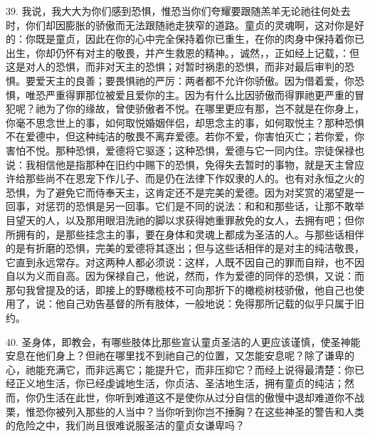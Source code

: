 39. 我说，我大大为你们感到恐惧，惟恐当你们夸耀要跟随羔羊无论祂往何处去时，你们却因膨胀的骄傲而无法跟随祂走狭窄的道路。童贞的灵魂啊，这对你是好的：你既是童贞，因此在你的心中完全保持着你已重生，在你的肉身中保持着你已出生，你却仍怀有对主的敬畏，并产生救恩的精神。，诚然，，正如经上记载，：但这是对人的恐惧，而非对天主的恐惧；对暂时祸患的恐惧，而非对最后审判的恐惧。要爱天主的良善；要畏惧祂的严厉：两者都不允许你骄傲。因为借着爱，你恐惧，唯恐严重得罪那位被爱且爱你的主。因为有什么比因骄傲而得罪祂更严重的冒犯呢？祂为了你的缘故，曾使骄傲者不悦。在哪里更应有那，岂不就是在你身上，你毫不思念世上的事，如何取悦婚姻伴侣，却思念主的事，如何取悦主？那种恐惧不在爱德中，但这种纯洁的敬畏不离弃爱德。若你不爱，你害怕灭亡；若你爱，你害怕不悦。那种恐惧，爱德将它驱逐；这种恐惧，爱德与它一同内住。宗徒保禄也说：我相信他是指那种在旧约中赐下的恐惧，免得失去暂时的事物，就是天主曾应许给那些尚不在恩宠下作儿子、而是仍在法律下作奴隶的人的。也有对永恒之火的恐惧，为了避免它而侍奉天主，这肯定还不是完美的爱德。因为对奖赏的渴望是一回事，对惩罚的恐惧是另一回事。它们是不同的说法：和和和那些话，让那不敢举目望天的人，以及那用眼泪洗祂的脚以求获得她重罪赦免的女人，去拥有吧；但你所拥有的，是那些挂念主的事，要在身体和灵魂上都成为圣洁的人。与那些话相伴的是有折磨的恐惧，完美的爱德将其逐出；但与这些话相伴的是对主的纯洁敬畏，它直到永远常存。对这两种人都必须说：这样，人既不因自己的罪而自辩，也不因自以为义而自高。因为保禄自己，他说，然而，作为爱德的同伴的恐惧，又说：而那句我曾提及的话，即接上的野橄榄枝不可向那折下的橄榄树枝骄傲，他自己也使用了，说：他自己劝告基督的所有肢体，一般地说：免得那所记载的似乎只属于旧约。\par

40. 圣身体，即教会，有哪些肢体比那些宣认童贞圣洁的人更应该谨慎，使圣神能安息在他们身上？但祂在哪里找不到祂自己的位置，又怎能安息呢？除了谦卑的心，祂能充满它，而非远离它；能提升它，而非压抑它？而经上说得最清楚：你已经正义地生活，你已经虔诚地生活，你贞洁、圣洁地生活，拥有童贞的纯洁；然而，你仍生活在此世，你听到难道这不是使你从过分自信的傲慢中退却难道你不战栗，惟恐你被列入那些的人当中？当你听到你岂不捶胸？在这些神圣的警告和人类的危险之中，我们尚且很难说服圣洁的童贞女谦卑吗？\par

